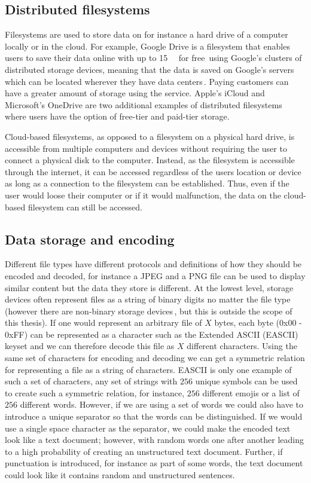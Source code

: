 \subsection{Distributed filesystems}
Filesystems are used to store data on for instance a hard drive of a computer locally or in the cloud. For example, Google Drive is a filesystem that enables users to save their data online with up to \SI{15}{\giga\byte} for free\,\cite{CloudStorageWork} using Google's clusters of distributed storage devices, meaning that the data is saved on Google's servers which can be located wherever they have data centers\,\cite{DistributedStorageWhat}. Paying customers can have a greater amount of storage using the service. Apple's iCloud and Microsoft's OneDrive are two additional examples of distributed filesystems where users have the option of free-tier and paid-tier storage.

Cloud-based filesystems, as opposed to a filesystem on a physical hard drive, is accessible from multiple computers and devices without requiring the user to connect a physical disk to the computer. Instead, as the filesystem is accessible through the internet, it can be accessed regardless of the users location or device as long as a connection to the filesystem can be established. Thus, even if the user would loose their computer or if it would malfunction, the data on the cloud-based filesystem can still be accessed.

\subsection{Data storage and encoding}
Different file types have different protocols and definitions of how they should be encoded and decoded, for instance a JPEG and a PNG file can be used to display similar content but the data they store is different. At the lowest level, storage devices often represent files as a string of binary digits no matter the file type (however there are non-binary storage devices\,\cite{MultistateDataStorage2020}, but this is outside the scope of this thesis). If one would represent an arbitrary file of $X$ bytes, each byte (0x00 - 0xFF) can be represented as a character such as the Extended ASCII (EASCII) keyset and we can therefore decode this file as $X$ different characters. Using the same set of characters for encoding and decoding we can get a symmetric relation for representing a file as a string of characters. EASCII is only one example of such a set of characters, any set of strings with $256$ unique symbols can be used to create such a symmetric relation, for instance, $256$ different emojis or a list of $256$ different words. However, if we are using a set of words we could also have to introduce a unique separator so that the words can be distinguished. If we would use a single space character as the separator, we could make the encoded text look like a text document; however, with random words one after another leading to a high probability of creating an unstructured text document. Further, if punctuation is introduced, for instance as part of some words, the text document could look like it contains random and unstructured sentences.

